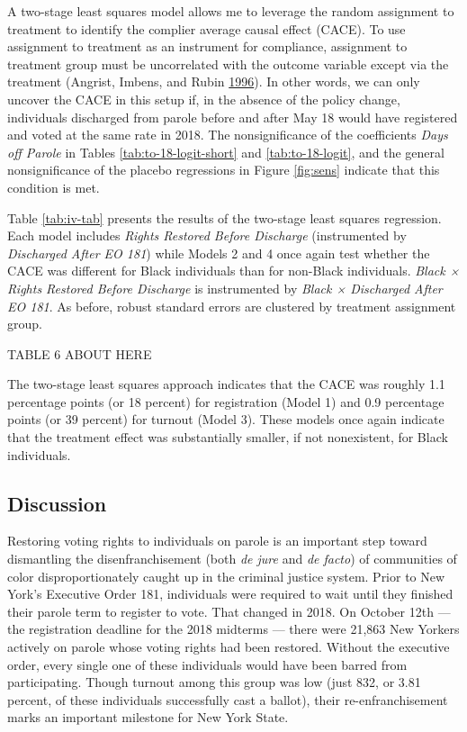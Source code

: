 \documentclass[
  12pt,
]{article}
\begin{document}
A two-stage least squares model allows me to leverage the random assignment to treatment to identify the complier average causal effect (CACE). To use assignment to treatment as an instrument for compliance, assignment to treatment group must be uncorrelated with the outcome variable except via the treatment (Angrist, Imbens, and Rubin \protect\hyperlink{ref-Angrist1996}{1996}). In other words, we can only uncover the CACE in this setup if, in the absence of the policy change, individuals discharged from parole before and after May 18 would have registered and voted at the same rate in 2018. The nonsignificance of the coefficients \emph{Days off Parole} in Tables \ref{tab:to-18-logit-short} and \ref{tab:to-18-logit}, and the general nonsignificance of the placebo regressions in Figure \ref{fig:sens} indicate that this condition is met.

Table \ref{tab:iv-tab} presents the results of the two-stage least squares regression. Each model includes \emph{Rights Restored Before Discharge} (instrumented by \emph{Discharged After EO 181}) while Models 2 and 4 once again test whether the CACE was different for Black individuals than for non-Black individuals. \emph{Black × Rights Restored Before Discharge} is instrumented by \emph{Black × Discharged After EO 181}. As before, robust standard errors are clustered by treatment assignment group.

TABLE 6 ABOUT HERE

The two-stage least squares approach indicates that the CACE was roughly 1.1 percentage points (or 18 percent) for registration (Model 1) and 0.9 percentage points (or 39 percent) for turnout (Model 3). These models once again indicate that the treatment effect was substantially smaller, if not nonexistent, for Black individuals.

\hypertarget{discussion}{%
\subsection*{Discussion}\label{discussion}}

Restoring voting rights to individuals on parole is an important step toward dismantling the disenfranchisement (both \emph{de jure} and \emph{de facto}) of communities of color disproportionately caught up in the criminal justice system. Prior to New York's Executive Order 181, individuals were required to wait until they finished their parole term to register to vote. That changed in 2018. On October 12th --- the registration deadline for the 2018 midterms --- there were 21,863 New Yorkers actively on parole whose voting rights had been restored. Without the executive order, every single one of these individuals would have been barred from participating. Though turnout among this group was low (just 832, or 3.81 percent, of these individuals successfully cast a ballot), their re-enfranchisement marks an important milestone for New York State.
\end{document}
